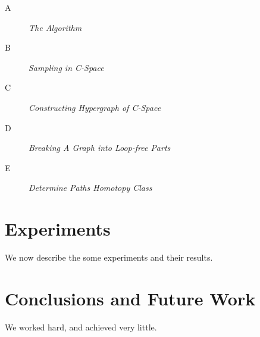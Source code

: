 \documentclass[11pt]{article}
\begin{document}
\begin{description}

\item[A] \emph{The Algorithm} \hfill \\

\item[B] \emph{Sampling in C-Space} \hfill \\

\item[C] \emph{Constructing Hypergraph of C-Space} \hfill \\

\item[D] \emph{Breaking A Graph into Loop-free Parts} \hfill\\

\item[E] \emph{Determine Paths Homotopy Class} \hfill \\

\end{description}

\section{Experiments}\label{experiments}
We now describe the some experiments and their results.

\section{Conclusions and Future Work}\label{conclusions}
We worked hard, and achieved very little.



\end{document}
